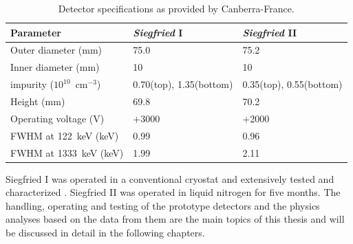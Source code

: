 \begin{table}[tbhp]
\centering
\caption{Detector specifications as provided by Canberra-France.}
\label{tab:tt:detpar}
\begin{tabular}{lll}\\\hline
Parameter & \emph{Siegfried} I  & \emph{Siegfried} II \\\hline
Outer diameter (mm)   & 75.0 & 75.2\\ 
Inner diameter (mm)   & 10 & 10 \\ 
impurity ($10^{10}$~cm$^{-3}$) & 
0.70(top), 1.35(bottom) & 0.35(top), 0.55(bottom) \\
Height (mm)           & 69.8 & 70.2 \\\hline 
Operating voltage (V) & +3000 & +2000 \\ 
FWHM at 122~keV (keV)  & 0.99 & 0.96 \\ 
FWHM at 1333~keV (keV) & 1.99 & 2.11 \\ \hline 
\end{tabular}
\end{table}

Siegfried I was operated in a conventional cryostat and extensively
tested and characterized \cite{Sie07}. Siegfried II was operated in
liquid nitrogen for five months. The handling, operating and testing
of the prototype detectors and the physics analyses based on the data
from them are the main topics of this thesis and will be discussed in
detail in the following chapters.

